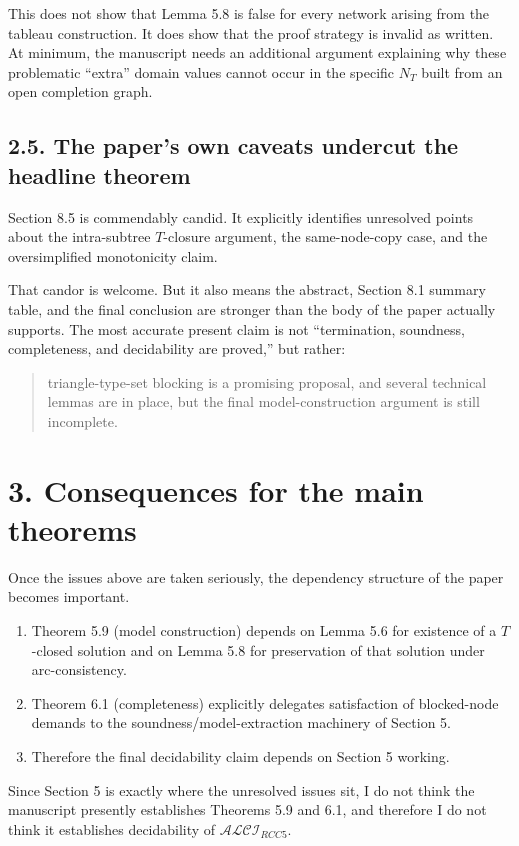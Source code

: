 \documentclass[11pt]{article}
\begin{document}
This does not show that Lemma 5.8 is false for every network arising from the tableau construction. It does show that the proof strategy is invalid as written. At minimum, the manuscript needs an additional argument explaining why these problematic ``extra'' domain values cannot occur in the specific \(N_T\) built from an open completion graph.

\subsection*{2.5. The paper's own caveats undercut the headline theorem}

Section 8.5 is commendably candid. It explicitly identifies unresolved points about the intra-subtree \(T\)-closure argument, the same-node-copy case, and the oversimplified monotonicity claim.

That candor is welcome. But it also means the abstract, Section 8.1 summary table, and the final conclusion are stronger than the body of the paper actually supports. The most accurate present claim is not ``termination, soundness, completeness, and decidability are proved,'' but rather:
\begin{quote}
triangle-type-set blocking is a promising proposal, and several technical lemmas are in place, but the final model-construction argument is still incomplete.
\end{quote}

\section*{3. Consequences for the main theorems}

Once the issues above are taken seriously, the dependency structure of the paper becomes important.

\begin{enumerate}[leftmargin=1.5em,itemsep=0.3em]
\item Theorem 5.9 (model construction) depends on Lemma 5.6 for existence of a \(T\)-closed solution and on Lemma 5.8 for preservation of that solution under arc-consistency.
\item Theorem 6.1 (completeness) explicitly delegates satisfaction of blocked-node demands to the soundness/model-extraction machinery of Section 5.
\item Therefore the final decidability claim depends on Section 5 working.
\end{enumerate}

Since Section 5 is exactly where the unresolved issues sit, I do not think the manuscript presently establishes Theorems 5.9 and 6.1, and therefore I do not think it establishes decidability of \(\mathcal{ALCI}_{RCC5}\).
\end{document}
